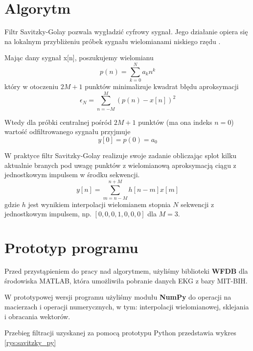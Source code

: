 \section{Algorytm}

Filtr Savitzky-Golay pozwala wygładzić cyfrowy sygnał. Jego działanie opiera się na lokalnym przybliżeniu próbek sygnału wielomianami niskiego rzędu \cite{whatissg}.

Mając dany sygnał x[n], poszukujemy wielomianu
\begin{equation}
p(n) = \sum\limits_{k=0}^N a_k n^k
\end{equation}
który w otoczeniu $2M+1$ punktów minimalizuje kwadrat błędu aproksymacji
\begin{equation}
\epsilon_N = \sum\limits_{n=-M}^M (p(n) - x[n])^2
\end{equation}

Wtedy dla próbki centralnej pośród $2M+1$ punktów (ma ona indeks $n=0$) wartość odfiltrowanego sygnału przyjmuje
\begin{equation}
y[0] = p(0) = a_0
\end{equation}

W praktyce filtr Savitzky-Golay realizuje swoje zadanie obliczając splot kilku aktualnie branych pod uwagę punktów z wielomianową aproksymacją ciągu z jednostkowym impulsem w środku sekwencji.
\begin{equation}
y[n] = \sum\limits_{m=n-M}^{n+M} h[n-m] x[m]
\end{equation}
gdzie $h$ jest wynikiem interpolacji wielomianem stopnia $N$ sekwencji z jednostkowym impulsem, np. $[0, 0, 0, 1, 0, 0, 0]$ dla $M=3$.



\section{Prototyp programu}

Przed przystąpieniem do pracy nad algorytmem, użyliśmy biblioteki \textbf{WFDB} dla środowiska MATLAB, która umożliwiła pobranie danych EKG z bazy MIT-BIH\cite{mit-bih}.

W prototypowej wersji programu użyliśmy modułu \textbf{NumPy} do operacji na macierzach i operacji numerycznych, w tym: interpolacji wielomianowej, sklejania i obracania wektorów. 



Przebieg filtracji uzyskanej za pomocą prototypu Python przedstawia wykres \ref{rys:savitzky_py}

